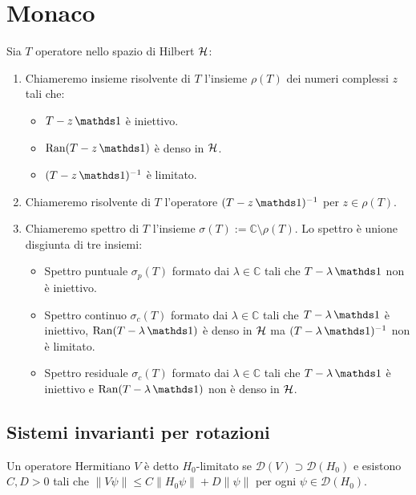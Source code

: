 \chapter{Monaco}

\begin{definition}
    Sia $T$ operatore nello spazio di Hilbert $\operatorname{\mathcal{H}}$:
\begin{enumerate}
    \item Chiameremo insieme risolvente di $T$ l'insieme $\rho(T)$ dei numeri complessi $z$ tali che:
    \begin{itemize}
        \item $T-z\un$ è iniettivo.
        \item $\Ran(T- z \un)$ è denso in $\operatorname{\mathcal{H}}$.
        \item $(T-z\un)^{-1}$ è limitato.
    \end{itemize}
    \item Chiameremo risolvente di $T$ l'operatore $(T-z\un)^{-1}$ per $z \in \rho(T)$.
    \item Chiameremo spettro di $T$ l'insieme $\sigma(T) := \mathbb{C} \setminus \rho(T)$. Lo spettro è unione disgiunta di tre insiemi:
    \begin{itemize}
        \item Spettro puntuale $\sigma_p(T)$ formato dai $\lambda \in \mathbb{C}$ tali che $T-\lambda \un$ non è iniettivo.
        \item Spettro continuo $\sigma_c(T)$ formato dai $\lambda \in \mathbb{C}$ tali che $T-\lambda \un$ è iniettivo, $\Ran(T-\lambda \un)$ è denso in $\operatorname{\mathcal{H}}$ ma $(T-\lambda \un)^{-1}$ non è limitato.
        \item Spettro residuale $\sigma_c(T)$ formato dai $\lambda \in \mathbb{C}$ tali che $T-\lambda \un$ è iniettivo e $\Ran(T-\lambda \un)$ non è denso in $\operatorname{\mathcal{H}}$.
    \end{itemize}
\end{enumerate}
\end{definition}


\section{Sistemi invarianti per rotazioni}
\begin{definition}
    Un operatore Hermitiano $V$ è detto $H_0$-limitato se $\mathcal{D}(V) \supset \mathcal{D}(H_0)$ e esistono $C,D> 0$ tali che $\| V \psi \| \leq C \| H_0 \psi \| + D \| \psi \|$ per ogni $\psi \in \mathcal{D}(H_0)$. 
\end{definition}

